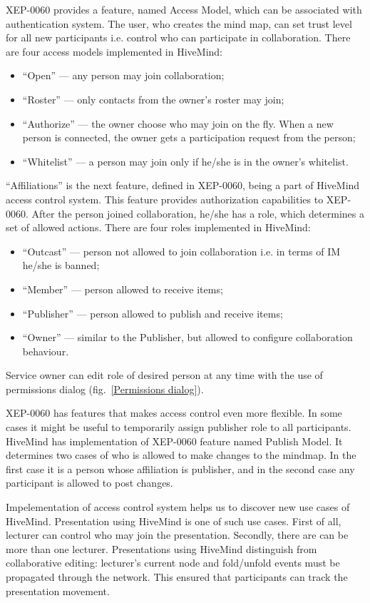 XEP-0060 provides a feature, named Access Model, which can be associated with
authentication system. The user, who creates the mind map, can set trust level
for all new participants i.e. control who can participate in collaboration.
There are four access models implemented in HiveMind:
\begin{itemize}
\item ``Open'' --- any person may join collaboration;
\item ``Roster'' --- only contacts from the owner’s roster may join;
\item ``Authorize'' --- the owner choose who may join on the fly. When a new
  person is connected, the owner gets a participation request from the person;
\item ``Whitelist'' --- a person may join only if he/she is in the owner’s
  whitelist.
\end{itemize}

``Affiliations'' is the next feature, defined in XEP-0060, being a part of
HiveMind access control system. This feature provides authorization capabilities
to XEP-0060. After the person joined collaboration, he/she has a role, which
determines a set of allowed actions. There are four roles implemented in
HiveMind:
\begin{itemize}
\item ``Outcast'' --- person not allowed to join collaboration i.e. in terms of
  IM he/she is banned;
\item ``Member'' --- person allowed to receive items;
\item ``Publisher'' --- person allowed to publish and receive items;
\item ``Owner'' --- similar to the Publisher, but allowed to configure
  collaboration behaviour.
\end{itemize}
Service owner can edit role of desired person at any time with the use of
permissions dialog (fig.~\ref{Permissions dialog}).

XEP-0060 has features that makes access control even more flexible. In some
cases it might be useful to temporarily assign publisher role to all
participants. HiveMind has implementation of XEP-0060 feature named Publish
Model. It determines two cases of who is allowed to make changes to the
mindmap. In the first case it is a person whose affiliation is publisher, and in
the second case any participant is allowed to post changes.

Impelementation of access control system helps us to discover new use cases of
HiveMind. Presentation using HiveMind is one of such use cases. First of all,
lecturer can control who may join the presentation. Secondly, there are can be
more than one lecturer. Presentations using HiveMind distinguish from
collaborative editing: lecturer's current node and fold/unfold events must be
propagated through the network. This ensured that participants can track the
presentation movement.
 
